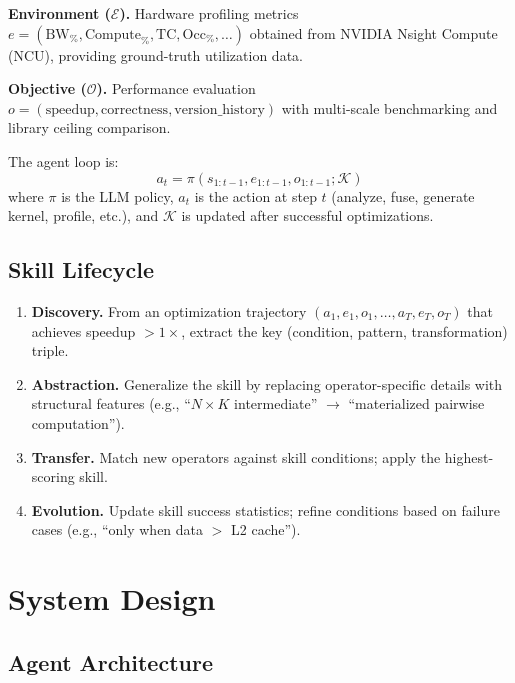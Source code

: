 \documentclass[sigconf,nonacm]{acmart}
\begin{document}
\textbf{Environment ($\mathcal{E}$).} Hardware profiling metrics $e = (\text{BW}_\%, \text{Compute}_\%, \text{TC}, \text{Occ}_\%, \ldots)$ obtained from NVIDIA Nsight Compute (NCU), providing ground-truth utilization data.

\textbf{Objective ($\mathcal{O}$).} Performance evaluation $o = (\text{speedup}, \text{correctness}, \text{version\_history})$ with multi-scale benchmarking and library ceiling comparison.

The agent loop is:
\begin{equation}
    a_t = \pi(s_{1:t-1}, e_{1:t-1}, o_{1:t-1}; \mathcal{K})
\end{equation}
where $\pi$ is the LLM policy, $a_t$ is the action at step $t$ (analyze, fuse, generate kernel, profile, etc.), and $\mathcal{K}$ is updated after successful optimizations.

\subsection{Skill Lifecycle}

\begin{enumerate}
    \item \textbf{Discovery.} From an optimization trajectory $(a_1, e_1, o_1, \ldots, a_T, e_T, o_T)$ that achieves speedup $> 1\times$, extract the key (condition, pattern, transformation) triple.
    \item \textbf{Abstraction.} Generalize the skill by replacing operator-specific details with structural features (e.g., ``$N \times K$ intermediate'' $\to$ ``materialized pairwise computation'').
    \item \textbf{Transfer.} Match new operators against skill conditions; apply the highest-scoring skill.
    \item \textbf{Evolution.} Update skill success statistics; refine conditions based on failure cases (e.g., ``only when data $>$ L2 cache'').
\end{enumerate}

\section{System Design}

\subsection{Agent Architecture}
\end{document}
